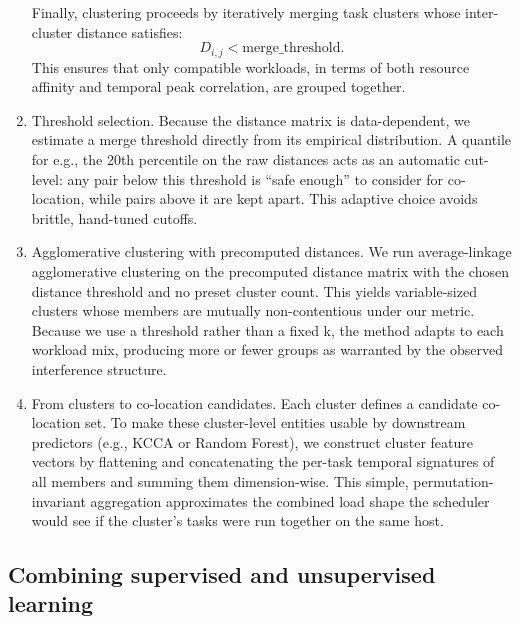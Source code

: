 \begin{enumerate}
          Finally, clustering proceeds by iteratively merging task clusters
          whose inter-cluster distance satisfies:
          \[
              D_{i,j} < \text{merge\_threshold}.
          \]
          This ensures that only compatible workloads, in terms of both
          resource affinity and temporal peak correlation, are grouped together.
    \item Threshold selection. Because the distance matrix is data-dependent, we estimate a merge threshold directly from its empirical distribution. A quantile for e.g., the 20th percentile on the raw distances acts as an automatic cut-level: any pair below this threshold is “safe enough” to consider for co-location, while pairs above it are kept apart. This adaptive choice avoids brittle, hand-tuned cutoffs.
    \item Agglomerative clustering with precomputed distances. We run average-linkage agglomerative clustering on the precomputed distance matrix with the chosen distance threshold and no preset cluster count. This yields variable-sized clusters whose members are mutually non-contentious under our metric. Because we use a threshold rather than a fixed k, the method adapts to each workload mix, producing more or fewer groups as warranted by the observed interference structure.
    \item From clusters to co-location candidates. Each cluster defines a candidate co-location set. To make these cluster-level entities usable by downstream predictors (e.g., KCCA or Random Forest), we construct cluster feature vectors by flattening and concatenating the per-task temporal signatures of all members and summing them dimension-wise. This simple, permutation-invariant aggregation approximates the combined load shape the scheduler would see if the cluster’s tasks were run together on the same host.
\end{enumerate}

\subsection{Combining supervised and unsupervised learning}
\label{sec:combining_supervised_and_unsupervised_learning}

